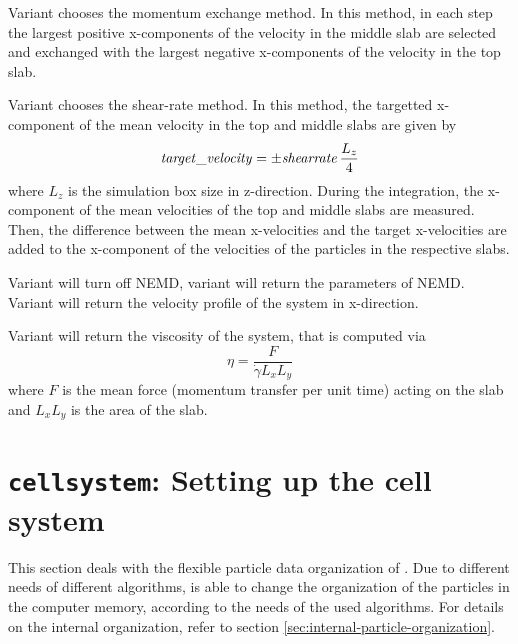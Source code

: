 
Variant  chooses the momentum exchange method.  In this
method, in each step the  largest positive
x-components of the velocity in the middle slab are selected and
exchanged with the  largest negative x-components of
the velocity in the top slab. 

Variant  chooses the shear-rate method. In this method, the
targetted x-component of the mean velocity in the top and middle slabs
are given by 
\begin{equation}
  \mathrm{\mathit{target\_velocity}} = \pm \mathrm{\mathit{shearrate}}\,\frac{L_z}{4}
\end{equation}
where $L_z$ is the simulation box size in z-direction. During the
integration, the x-component of the mean velocities of the top and
middle slabs are measured.  Then, the difference between the mean
x-velocities and the target x-velocities are added to the x-component
of the velocities of the particles in the respective slabs. 

Variant  will turn off NEMD, variant  will
return the parameters of NEMD. Variant  will return the
velocity profile of the system in x-direction.


Variant  will return the viscosity of the system, that is
computed via
\begin{equation}
  \eta = \frac{F}{\dot{\gamma} L_x L_y}
\end{equation}
where $F$ is the mean force (momentum transfer per unit time) acting
on the slab and $L_x L_y$ is the area of the slab.


\section{\texttt{cellsystem}: Setting up the cell system}
\label{sec:cell-systems}

This section deals with the flexible particle data organization of
\es.  Due to different needs of different algorithms, \es is able to
change the organization of the particles in the computer memory,
according to the needs of the used algorithms. For details on the
internal organization, refer to section
\vref{sec:internal-particle-organization}.

